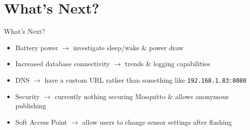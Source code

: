 \documentclass[aspectratio=169]{beamer}
\begin{document}
  \renewcommand{\sectitle}{What's Next?}
  \section{\sectitle}
  \begin{frame}{\sectitle}
    \begin{itemize}
      \item Battery power $\rightarrow$ investigate sleep/wake \& power draw
      \item Increased database connectivity $\rightarrow$ trends \& logging capabilities
      \item DNS $\rightarrow$ have a custom URL rather than something like \texttt{192.168.1.83:8080}
      \item Security $\rightarrow$ currently nothing securing Mosquitto \& allows anonymous publishing
      \item Soft Access Point $\rightarrow$ allow users to change sensor settings after flashing
    \end{itemize}
  \end{frame}


  \renewcommand{\sectitle}{Demo Screenshots}
\end{document}
